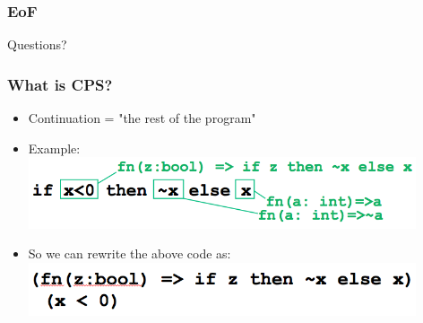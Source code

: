 \documentclass[14pt]{beamer}
\begin{document}
%
\begin{frame}
\frametitle{EoF}
\begin{center}
Questions?
\end{center}

\end{frame}


%
\begin{frame}[noframenumbering]
\frametitle{What is CPS?}
\begin{itemize}
\item Continuation = "the rest of the program"
\item Example:
\includegraphics[width=0.9\textwidth]{CPS1}
\pause
\item So we can rewrite the above code as:
\includegraphics[width=0.9\textwidth]{CPS2}

\end{itemize}
\end{frame}


%	
\end{document}
